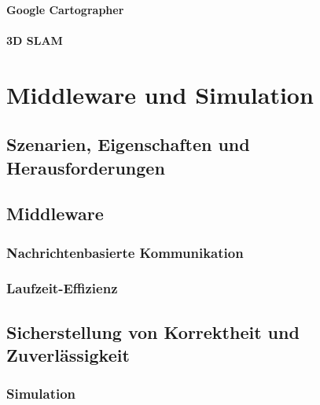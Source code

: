 \documentclass[a4paper, 11pt, accentcolor = tud3b]{tudreport}
\begin{document}
				\subsubsection{Google Cartographer} %

				\subsubsection{3D SLAM} %

	\chapter{Middleware und Simulation} %

		\section{Szenarien, Eigenschaften und Herausforderungen} %

		\section{Middleware} %

			\subsection{Nachrichtenbasierte Kommunikation} %

			\subsection{Laufzeit-Effizienz} %

		\section{Sicherstellung von Korrektheit und Zuverlässigkeit} %

			\subsection{Simulation} %
\end{document}
